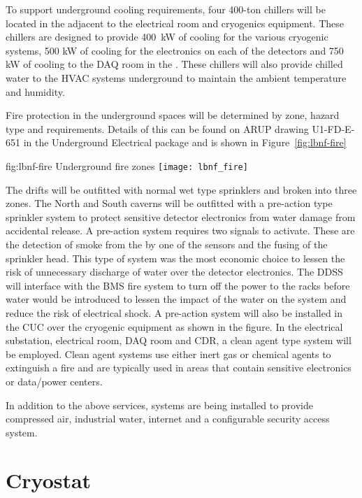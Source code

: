 To support underground cooling requirements, four 400-ton chillers
will be located in the  adjacent to the electrical room and
cryogenics equipment.  These chillers are designed to provide \SI{400}{\kilo\watt}
of cooling for the various cryogenic systems, 500 kW of cooling for
the electronics on each of the detectors and 750 kW of cooling to the
DAQ room in the .  These chillers will also provide chilled water
to the HVAC systems underground to maintain the ambient temperature
and humidity.

Fire protection in the underground spaces will be determined by zone,
hazard type and requirements.  Details of this can be found on ARUP
drawing U1-FD-E-651 in the Underground Electrical package and is shown
in Figure~\ref{fig:lbnf-fire}
\begin{dunefigure}{fig:lbnf-fire}
  {Underground fire zones}
 \texttt{[image: lbnf\_fire]}
\end{dunefigure}
The drifts will be outfitted with normal wet type sprinklers and
broken into three zones.  The North and South caverns will be outfitted
with a pre-action type sprinkler system to protect sensitive detector
electronics from water damage from accidental release.  A pre-action
system requires two signals to activate.  These are the detection of
smoke from the by one of the sensors and the fusing of the sprinkler
head.  This type of system was the most economic choice to lessen the
risk of unnecessary discharge of water over the detector electronics.
The DDSS will interface with the BMS fire system to turn off the power
to the racks before water would be introduced to lessen the impact of
the water on the system and reduce the risk of electrical shock.  A
pre-action system will also be installed in the CUC over the cryogenic
equipment as shown in the figure.  In the electrical substation,
electrical room, DAQ room and CDR, a clean agent type system will be
employed.  Clean agent systems use either inert gas or chemical agents
to extinguish a fire and are typically used in areas that contain
sensitive electronics or data/power centers.

In addition to the above services, systems are being installed to
provide compressed air, industrial water, internet and a configurable
security access system.

\section{Cryostat}
\label{sec:fdsp-coord-cryostat}

